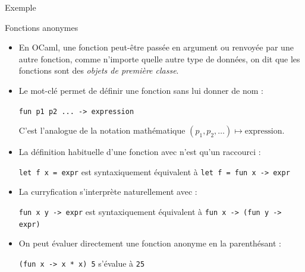 \documentclass[10pt]{beamer}
\begin{document}
\begin{frame}{\Ctitle}{\stitle}
	\begin{exampleblock}{Exemple}
	\end{exampleblock}
\end{frame}

\begin{frame}{\Ctitle}{\stitle}
	\begin{block}{Fonctions anonymes}
		\begin{itemize}
			\item<1-> En OCaml, une fonction peut-être passée en argument ou renvoyée par une autre fonction, comme n'importe quelle autre type de données, on dit que les fonctions sont des \textit{objets de première classe}.
			\item<2-> Le mot-clé  permet de définir une fonction sans lui donner de nom :
				\begin{center}
					\texttt{fun p1 p2 ... -> expression}
				\end{center}
				C'est l'analogue de la notation mathématique $(p_1, p_2, \dots) \mapsto \text{expression}$.
			\item<3-> La définition habituelle d'une fonction avec  n'est qu'un raccourci :
				\begin{center}
					\texttt{let f x = expr}  est syntaxiquement équivalent à \texttt{let f = fun x -> expr}
				\end{center}
			\item<4-> La curryfication s'interprète naturellement avec  :
				\begin{center}
					\texttt{fun x y -> expr}  est syntaxiquement équivalent à \texttt{fun x -> (fun y -> expr)}
				\end{center}
			\item<5-> On peut évaluer directement une fonction anonyme en la parenthésant :
				\begin{center}
					\texttt{(fun x -> x * x) 5} s'évalue à \texttt{25}
				\end{center}
		\end{itemize}
	\end{block}
\end{frame}
\end{document}
